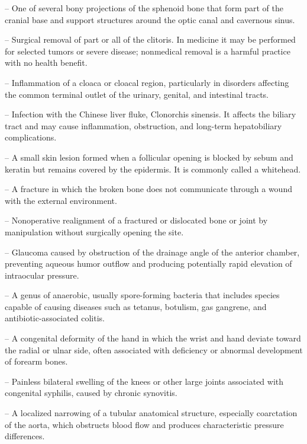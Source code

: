 -- One of several bony projections of the sphenoid bone that form part of the cranial base and support structures around the optic canal and cavernous sinus.

-- Surgical removal of part or all of the clitoris. In medicine it may be performed for selected tumors or severe disease; nonmedical removal is a harmful practice with no health benefit.

-- Inflammation of a cloaca or cloacal region, particularly in disorders affecting the common terminal outlet of the urinary, genital, and intestinal tracts.

-- Infection with the Chinese liver fluke, Clonorchis sinensis. It affects the biliary tract and may cause inflammation, obstruction, and long-term hepatobiliary complications.

-- A small skin lesion formed when a follicular opening is blocked by sebum and keratin but remains covered by the epidermis. It is commonly called a whitehead.

-- A fracture in which the broken bone does not communicate through a wound with the external environment.

-- Nonoperative realignment of a fractured or dislocated bone or joint by manipulation without surgically opening the site.

-- Glaucoma caused by obstruction of the drainage angle of the anterior chamber, preventing aqueous humor outflow and producing potentially rapid elevation of intraocular pressure.

-- A genus of anaerobic, usually spore-forming bacteria that includes species capable of causing diseases such as tetanus, botulism, gas gangrene, and antibiotic-associated colitis.

-- A congenital deformity of the hand in which the wrist and hand deviate toward the radial or ulnar side, often associated with deficiency or abnormal development of forearm bones.

-- Painless bilateral swelling of the knees or other large joints associated with congenital syphilis, caused by chronic synovitis.

-- A localized narrowing of a tubular anatomical structure, especially coarctation of the aorta, which obstructs blood flow and produces characteristic pressure differences.

